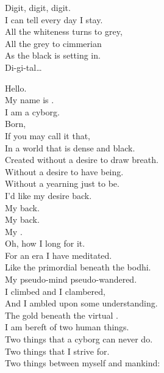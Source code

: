 Digit, digit, digit. \\

I can tell every day I stay. \\
All the whiteness turns to grey, \\
All the grey to cimmerian \\
As the black is setting in. \\

Di-gi-tal… \\





Hello. \\
My name is . \\
I am a cyborg. \\

Born, \\
If you may call it that, \\
In a world that is dense and black. \\

Created without a desire to draw breath. \\
Without a desire to have being. \\
Without a yearning just to be. \\

I'd like my desire back. \\
My  back. \\
My  back. \\
My . \\
Oh, how I long for it. \\

For an era I have meditated. \\
Like the primordial  beneath the bodhi. \\
My pseudo-mind pseudo-wandered. \\
I climbed and I clambered, \\
And I ambled upon some understanding. \\
The gold beneath the virtual . \\

I am bereft of two human things. \\
Two things that a cyborg can never do. \\
Two things that I strive for. \\
Two things between myself and mankind: \\

